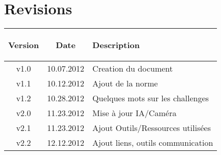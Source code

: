 \part*{Revisions}

%
%

\begin{tabular}{|c|c|C{7.5cm}|}
	\hline
		\begin{bf}Version\end{bf} & \begin{bf}Date\end{bf} & \begin{bf}Description\end{bf} \\
	\hline
		v1.0 & 10.07.2012 & Creation du document \\
	\hline
		v1.1 & 10.12.2012 & Ajout de la norme \\
	\hline
		v1.2 & 10.28.2012 & Quelques mots sur les challenges \\
	\hline
		v2.0 & 11.23.2012 & Mise à jour IA/Caméra \\
	\hline
		v2.1 & 11.23.2012 & Ajout Outils/Ressources utilisées \\
	\hline
		v2.2 & 12.12.2012 & Ajout liens, outils communication \\
	\hline
\end{tabular}